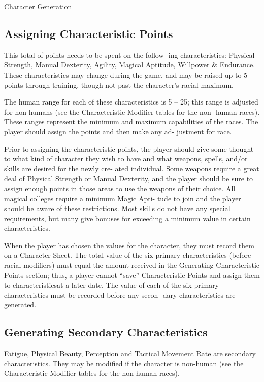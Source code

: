 \begin{Chapter}{Character Generation}
\subsection{Assigning Characteristic Points}

This total of points needs to be spent on the follow- ing
characteristics: Physical Strength, Manual Dexterity, Agility, Magical
Aptitude, Willpower \& Endurance.  These characteristics may change
during the game, and may be raised up to 5 points through training,
though not past the character’s racial maximum.

The human range for each of these characteristics is 5 – 25; this
range is adjusted for non-humans (see the Characteristic Modifier
tables for the non- human races). These ranges represent the minimum
and maximum capabilities of the races. The player should assign the
points and then make any ad- justment for race.

Prior to assigning the characteristic points, the player should give
some thought to what kind of character they wish to have and what
weapons, spells, and/or skills are desired for the newly cre- ated
individual. Some weapons require a great deal of Physical Strength or
Manual Dexterity, and the player should be sure to assign enough
points in those areas to use the weapons of their choice. All magical
colleges require a minimum Magic Apti- tude to join and the player
should be aware of these restrictions.  Most skills do not have any
special requirements, but many give bonuses for exceeding a minimum
value in certain characteristics.

When the player has chosen the values for the character, they must
record them on a Character Sheet. The total value of the six primary
characteristics (before racial modifiers) must equal the amount
received in the Generating Characteristic Points section; thus, a
player cannot “save” Characteristic Points and assign them to
characteristicsat a later date. The value of each of the six primary
characteristics must be recorded before any secon- dary
characteristics are generated.

\subsection{Generating Secondary Characteristics}

Fatigue, Physical Beauty, Perception and Tactical Movement Rate are
secondary characteristics.  They may be modified if the character is
non-human (see the Characteristic Modifier tables for the non-human
races).


\end{Chapter}
